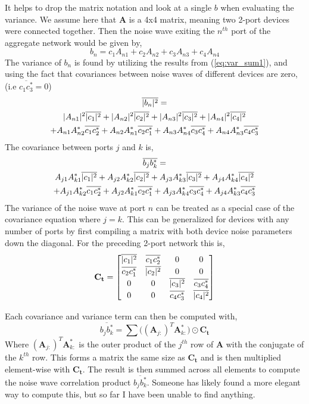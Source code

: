 \documentclass[journal]{IEEEtran}
\newcommand{\nwcv}[2]{\overline{#1#2^*}}
\newcommand{\nwv}[1]{\overline{|#1|^2}}
\begin{document}
It helps to drop the matrix notation and look at a single \(b\) when evaluating the variance. We assume here that \(\mathbf{A}\) is a 4x4 matrix, meaning two 2-port devices were connected together. Then the noise wave exiting the \(n^{th}\) port of the aggregate network would be given by,
\[b_n = c_1 A_{n1} + c_2 A_{n2} + c_3 A_{n3} + c_4 A_{n4} \]
The variance of \(b_n\) is found by utilizing the results from (\ref{eq:var_sum1}), and using the fact that covariances between noise waves of different devices are zero, (i.e \(\nwcv{c_{1}}{c_{3}} = 0\))
\begin{gather}
\nwv{b_n} = \notag \\
|A_{n1}|^2 \nwv{c_1} + |A_{n2}|^2 \nwv{c_2} + |A_{n3}|^2 \nwv{c_3} + |A_{n4}|^2 \nwv{c_4} \notag \\
+ A_{n1}A_{n2}^* \nwcv{c_{1}}{c_{2}} + A_{n2}A_{n1}^* \nwcv{c_{2}}{c_{1}} \notag
+ A_{n3}A_{n4}^* \nwcv{c_{3}}{c_{4}} + A_{n4}A_{n3}^* \nwcv{c_{4}}{c_{3}} \notag
\end{gather}
%
The covariance between ports \(j\) and \(k\) is,
\begin{gather}
\nwcv{b_j}{b_k} = \notag \\
A_{j1}A_{k1}^* \nwv{c_1} + A_{j2}A_{k2}^*\nwv{c_2} + A_{j3}A_{k3}^* \nwv{c_3} + A_{j4}A_{k4}^* \nwv{c_4} \notag \\
+ A_{j1}A_{k2}^* \nwcv{c_{1}}{c_{2}} + A_{j2}A_{k1}^* \nwcv{c_{2}}{c_{1}} \notag
+ A_{j3}A_{k4}^* \nwcv{c_{3}}{c_{4}} + A_{j4}A_{k3}^* \nwcv{c_{4}}{c_{3}} \notag
\end{gather}
The variance of the noise wave at port \(n\) can be treated as a special case of the covariance equation where \(j=k\). This can be generalized for devices with any number of ports by first compiling a matrix with both device noise parameters down the diagonal. For the preceding 2-port network this is,
\[
\mathbf{C_t} = 
\renewcommand*{\arraystretch}{1.2}
\begin{bmatrix}
\nwv{c_1}          & \nwcv{c_{1}}{c_{2}}         & 0   & 0   \\
\nwcv{c_{2}}{c_{1}}           & \nwv{c_2}         & 0 &0 \\
0            & 0         & \nwv{c_3} & \nwcv{c_{3}}{c_{4}} \\
0            & 0  & \nwcv{c_{4}}{c_{3}}   & \nwv{c_4}  \\
\end{bmatrix}
\]

Each covariance and variance term can then be computed with,
\[ \nwcv{b_j}{b_k} = \sum{\Big((\mathbf{A}_{j:})^T \mathbf{A}^*_{k:}\Big) \odot \mathbf{C_t}} \]
%
Where \((\mathbf{A}_{j:})^T \mathbf{A}^*_{k:}\) is the outer product of the \(j^{th}\) row of \(\mathbf{A}\) with the conjugate of the \(k^{th}\) row. This forms a matrix the same size as \(\mathbf{C_t}\) and is then multiplied element-wise with \(\mathbf{C_t}\). The result is then summed across all elements to compute the noise wave correlation product \(\nwcv{b_j}{b_k}\). Someone has likely found a more elegant way to compute this, but so far I have been unable to find anything.
\end{document}
